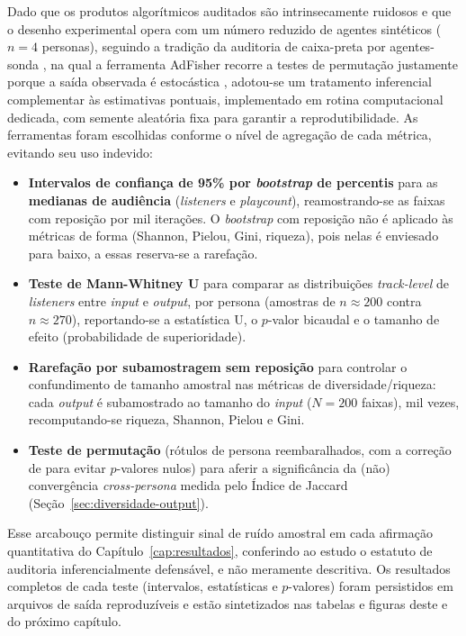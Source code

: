 \documentclass[12pt, %
openright,
oneside, %
a4paper,    %
english,   %
brazil]{facom-ufu-abntex2}
\begin{document}
Dado que os produtos algorítmicos auditados são intrinsecamente ruidosos e que o
desenho experimental opera com um número reduzido de agentes sintéticos
($n = 4$ personas), seguindo a tradição da auditoria de caixa-preta por
agentes-sonda \cite{sandvig2014auditing}, na qual a ferramenta AdFisher
recorre a testes de permutação justamente porque a saída observada é estocástica
\cite{datta2015automated}, adotou-se um tratamento inferencial complementar
às estimativas pontuais, implementado em rotina computacional dedicada, com
semente aleatória fixa para garantir a reprodutibilidade. As ferramentas foram escolhidas conforme o nível de agregação
de cada métrica, evitando seu uso indevido:

\begin{itemize}
  \item \textbf{Intervalos de confiança de 95\% por \emph{bootstrap} de
  percentis} \cite{efron1993introduction} para as \textbf{medianas de audiência}
  (\emph{listeners} e \emph{playcount}), reamostrando-se as faixas com reposição
  por mil iterações. O \emph{bootstrap} com reposição não é aplicado às métricas
  de forma (Shannon, Pielou, Gini, riqueza), pois nelas é enviesado para baixo,
a essas reserva-se a rarefação.

  \item \textbf{Teste de Mann-Whitney U} \cite{mann1947test} para comparar as
  distribuições \emph{track-level} de \emph{listeners} entre \emph{input} e
  \emph{output}, por persona (amostras de $n \approx 200$ contra $n \approx 270$),
  reportando-se a estatística U, o $p$-valor bicaudal e o tamanho de efeito
  (probabilidade de superioridade).

  \item \textbf{Rarefação por subamostragem sem reposição}
  \cite{gotelli2001quantifying} para controlar o confundimento de tamanho
  amostral nas métricas de diversidade/riqueza: cada \emph{output} é subamostrado
  ao tamanho do \emph{input} ($N = 200$ faixas), mil vezes, recomputando-se
  riqueza, Shannon, Pielou e Gini.

  \item \textbf{Teste de permutação} (rótulos de persona reembaralhados, com a
  correção de  para evitar $p$-valores nulos)
  para aferir a significância da (não) convergência \emph{cross-persona} medida
  pelo Índice de Jaccard (Seção~\ref{sec:diversidade-output}).
\end{itemize}

Esse arcabouço permite distinguir sinal de ruído amostral em cada afirmação
quantitativa do Capítulo~\ref{cap:resultados}, conferindo ao estudo o estatuto de
auditoria inferencialmente defensável, e não meramente descritiva. Os resultados
completos de cada teste (intervalos, estatísticas e $p$-valores) foram
persistidos em arquivos de saída reproduzíveis e estão sintetizados nas tabelas
e figuras deste e do próximo capítulo.
\end{document}

